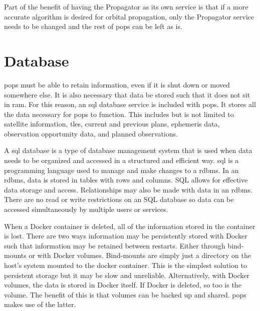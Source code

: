 
Part of the benefit of having the Propagator as its own service is that if a
more accurate algorithm is desired for orbital propagation, only the Propagator
service needs to be changed and the rest of \gls{pops} can be left as is.



\section{Database}\label{sec:database}

\gls{pops} must be able to retain information, even if it is
shut down or moved somewhere else. It is also necessary that data be stored
such that it does not sit in \gls{ram}. For this reason, an \acrshort{sql}
database service is included with \gls{pops}. It stores all the data necessary
for \gls{pops} to function. This includes but is not limited to satellite
information, \glspl{tle}, current and previous plans, ephemeris data,
observation opportunity data, and planned observations. 

A \gls{sql} database is a type of database management system that is used when
data needs to be organized and accessed in a structured and efficient way.
\gls{sql} is a programming language used to manage and make changes to a
\gls{rdbms}. In an \gls{rdbms}, data is stored in tables with rows and columns.
SQL allows for effective data storage and access. Relationships may also be
made with data in an \gls{rdbms}. There are no read or write restrictions on an
SQL database so data can be accessed simultaneously by multiple users or
services.

When a Docker container is deleted, all of the information stored in the
container is lost.  There are two ways information may be persistently stored
with Docker such that information may be retained between restarts. Either
through bind-mounts or with Docker volumes.  Bind-mounts are simply just a
directory on the host's system mounted to the docker container. This is the
simplest solution to persistent storage but it may be slow and unreliable.
Alternatively, with Docker volumes, the data is stored in Docker itself. If
Docker is deleted, so too is the volume. The benefit of this is that volumes
can be backed up and shared. \gls{pops} makes use of the latter.

